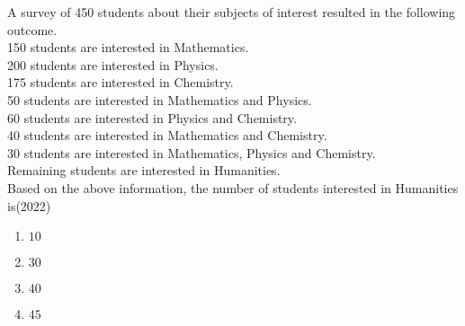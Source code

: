 \item A survey of 450 students about their subjects of interest resulted in the
following outcome.\\

150 students are interested in Mathematics.\\
200 students are interested in Physics.\\
175 students are interested in Chemistry.\\
50 students are interested in Mathematics and Physics.\\
60 students are interested in Physics and Chemistry.\\
40 students are interested in Mathematics and Chemistry.\\
30 students are interested in Mathematics, Physics and Chemistry.\\
Remaining students are interested in Humanities.\\

Based on the above information, the number of students interested in
Humanities is\hfill(2022)
\begin{multicols}{2}
\begin{enumerate}
\item $10$
\item $30$
\item $40$
\item $45$
\end{enumerate}
\end{multicols}




